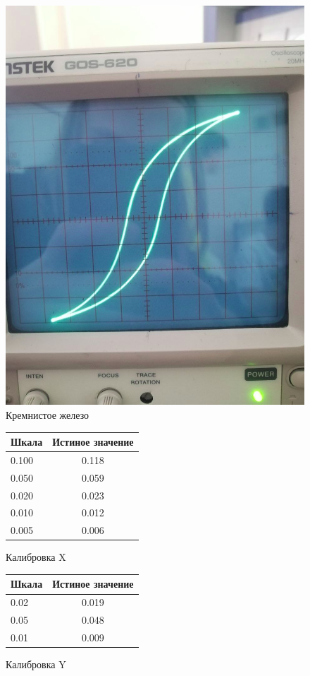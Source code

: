 \documentclass[14pt,a4paper]{article}
\begin{document}
\begin{figure}[H]
  \includegraphics*[width=\textwidth]{2023-09-30-18-32-30.png}
  \caption{Кремнистое железо}
\end{figure}

\begin{figure}[H]
  \centering
  \begin{tabular}{l|c}
    Шкала &Истиное значение \\
    \midrule
    0.100 &  0.118\\
    0.050 &  0.059\\
    0.020 &  0.023\\
    0.010 &  0.012\\
    0.005 &  0.006
    \caption{Калибровка X}
    \label{x}
  \end{tabular}
\end{figure}
\begin{figure}[H]
\begin{tabular}{l|c}
  Шкала &Истиное значение\\
  \midrule
  0.02 &  0.019 \\
  0.05 &  0.048 \\
  0.01 &  0.009 \caption{Калибровка Y}\label{y}
  \end{tabular}
\end{figure}
\end{document}

